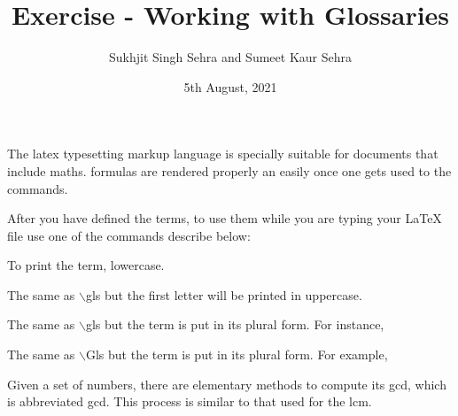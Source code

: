 \documentclass[11pt,a4paper]{article}
\title{Exercise - Working with Glossaries}
\author{Sukhjit Singh Sehra and Sumeet Kaur Sehra}
\date{5th August, 2021}
\begin{document}
%
\maketitle
%
The \Gls{latex} typesetting markup language is specially suitable 
for documents that include \gls{maths}. \Glspl{formula} are 
rendered properly an easily once one gets used to the commands.

\begin{description}
	\item After you have defined the terms, to use them while you are typing your LaTeX file use one of the commands describe below:
	
	\item[$\backslash$gls{ }]
	To print the term, lowercase. 
	\item[$\backslash$Gls{ }]
	The same as $\backslash$gls but the first letter will be printed in uppercase.
	
	\item[$\backslash$glspl{ }]
	The same as $\backslash$gls but the term is put in its plural form. For instance, 
	
	\item[$\backslash$Glspl{ }]
	The same as $\backslash$Gls but the term is put in its plural form. For example, 
\end{description}
 
Given a set of numbers, there are elementary methods to compute 
its \acrlong{gcd}, which is abbreviated \acrshort{gcd}. This 
process is similar to that used for the \acrfull{lcm}.
%
\printglossary[title=Abbrevations, toctitle=List of terms,type=\acronymtype]
\printglossary
\end{document}
